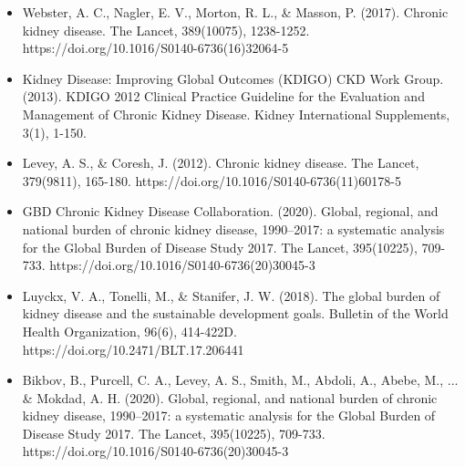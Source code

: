 \documentclass{article}
\begin{document}
\begin{itemize}
\item Webster, A. C., Nagler, E. V., Morton, R. L., \& Masson, P. (2017). Chronic kidney disease. The Lancet, 389(10075), 1238-1252. https://doi.org/10.1016/S0140-6736(16)32064-5
\item Kidney Disease: Improving Global Outcomes (KDIGO) CKD Work Group. (2013). KDIGO 2012 Clinical Practice Guideline for the Evaluation and Management of Chronic Kidney Disease. Kidney International Supplements, 3(1), 1-150.
\item Levey, A. S., \& Coresh, J. (2012). Chronic kidney disease. The Lancet, 379(9811), 165-180. https://doi.org/10.1016/S0140-6736(11)60178-5
\item GBD Chronic Kidney Disease Collaboration. (2020). Global, regional, and national burden of chronic kidney disease, 1990–2017: a systematic analysis for the Global Burden of Disease Study 2017. The Lancet, 395(10225), 709-733. https://doi.org/10.1016/S0140-6736(20)30045-3
\item Luyckx, V. A., Tonelli, M., \& Stanifer, J. W. (2018). The global burden of kidney disease and the sustainable development goals. Bulletin of the World Health Organization, 96(6), 414-422D. https://doi.org/10.2471/BLT.17.206441
\item Bikbov, B., Purcell, C. A., Levey, A. S., Smith, M., Abdoli, A., Abebe, M., ... \& Mokdad, A. H. (2020). Global, regional, and national burden of chronic kidney disease, 1990–2017: a systematic analysis for the Global Burden of Disease Study 2017. The Lancet, 395(10225), 709-733. https://doi.org/10.1016/S0140-6736(20)30045-3
\end{itemize}
\newpage
\thispagestyle{empty}
\end{document}

